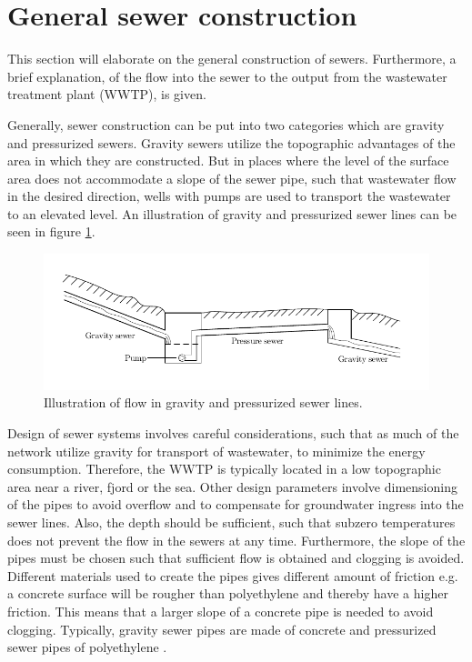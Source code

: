 \section{General sewer construction}\label{se:sewer_construction}
This section will elaborate on the general construction of sewers. Furthermore, a brief explanation, of the flow into the sewer to the output from the wastewater treatment plant (WWTP), is given.


Generally, sewer construction can be put into two categories which are gravity and pressurized sewers. Gravity sewers utilize the topographic advantages of the area in which they are constructed. But in places where the level of the surface area does not accommodate a slope of the sewer pipe, such that wastewater flow in the desired direction, wells with pumps are used to transport the wastewater to an elevated level. An illustration of gravity and pressurized sewer lines can be seen in figure \ref{fig:Sewer_drawing}. 

\begin{figure}[H]
\centering
\includegraphics[width=1\textwidth]{report/introduction/pictures/Sewer_drawing.pdf}
\caption{Illustration of flow in gravity and pressurized sewer lines.}
\label{fig:Sewer_drawing}
\end{figure}

Design of sewer systems involves careful considerations, such that as much of the network utilize gravity for transport of wastewater, to minimize the energy consumption. Therefore, the WWTP is typically located in a low topographic area near a river, fjord or the sea. Other design parameters involve dimensioning of the pipes to avoid overflow and to compensate for groundwater ingress into the sewer lines.
Also, the depth should be sufficient, such that subzero temperatures does not prevent the flow in the sewers at any time. Furthermore, the slope of the pipes must be chosen such that sufficient flow is obtained and clogging is avoided. Different materials used to create the pipes gives different amount of friction e.g. a concrete surface will be rougher than polyethylene and thereby have a higher friction. This means that a larger slope of a concrete pipe is needed to avoid clogging. Typically, gravity sewer pipes are made of concrete and pressurized sewer pipes of polyethylene \cite{Sewer_processes}.

